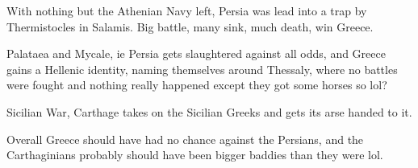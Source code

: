 \documentclass[twoside, a4paper, 12pt]{article}
\begin{document}
With nothing but the Athenian Navy left, Persia was lead into a trap
by Thermistocles in Salamis. Big battle, many sink, much death, win Greece.

\par\vspace{1em}

Palataea and Mycale, ie Persia gets slaughtered against all odds, and
Greece gains a Hellenic identity, naming themselves around Thessaly, where
no battles were fought and nothing really happened except they got some horses
so lol?

\par\vspace{1em}

Sicilian War, Carthage takes on the Sicilian Greeks and gets its arse handed to
it.

\par\vspace{1em}

Overall Greece should have had no chance against the Persians, and the
Carthaginians probably should have been bigger baddies than they were lol.

\newpage
\listoffigures

\printbibliography
\end{document}
